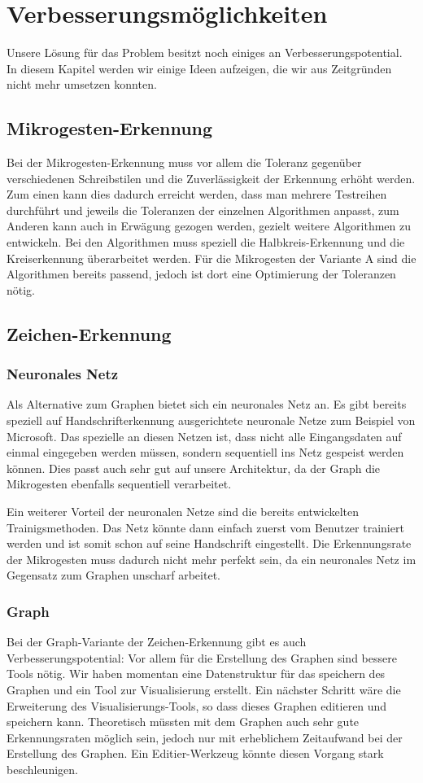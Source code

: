 \chapter{Verbesserungsmöglichkeiten}
Unsere Lösung für das Problem besitzt noch einiges an Verbesserungspotential. In diesem Kapitel werden wir einige Ideen aufzeigen, die wir aus Zeitgründen nicht mehr umsetzen konnten.

\section{Mikrogesten-Erkennung}
Bei der Mikrogesten-Erkennung muss vor allem die Toleranz gegenüber verschiedenen Schreibstilen und die Zuverlässigkeit der Erkennung erhöht werden. Zum einen kann dies dadurch erreicht werden, dass man mehrere Testreihen durchführt und jeweils die Toleranzen der einzelnen Algorithmen anpasst, zum Anderen kann auch in Erwägung gezogen werden, gezielt weitere Algorithmen zu entwickeln. 
Bei den Algorithmen muss speziell die Halbkreis-Erkennung und die Kreiserkennung überarbeitet werden. Für die Mikrogesten der Variante A sind die Algorithmen bereits passend, jedoch ist dort eine Optimierung der Toleranzen nötig.

\section{Zeichen-Erkennung}
\subsection{Neuronales Netz}
Als Alternative zum Graphen bietet sich ein neuronales Netz an. Es gibt bereits speziell auf Handschrifterkennung ausgerichtete neuronale Netze zum Beispiel von Microsoft. Das spezielle an diesen Netzen ist, dass nicht alle Eingangsdaten auf einmal eingegeben werden müssen, sondern sequentiell ins Netz gespeist werden können. Dies passt auch sehr gut auf unsere Architektur, da der Graph die Mikrogesten ebenfalls sequentiell verarbeitet.

Ein weiterer Vorteil der neuronalen Netze sind die bereits entwickelten Trainigsmethoden. Das Netz könnte dann einfach zuerst vom Benutzer trainiert werden und ist somit schon auf seine Handschrift eingestellt. Die Erkennungsrate der Mikrogesten muss dadurch nicht mehr perfekt sein, da ein neuronales Netz im Gegensatz zum Graphen unscharf arbeitet. 

\subsection{Graph}
Bei der Graph-Variante der Zeichen-Erkennung gibt es auch Verbesserungspotential: Vor allem für die Erstellung des Graphen sind bessere Tools nötig. Wir haben momentan eine Datenstruktur für das speichern des Graphen und ein Tool zur Visualisierung erstellt. Ein nächster Schritt wäre die Erweiterung des Visualisierungs-Tools, so dass dieses Graphen editieren und speichern kann. Theoretisch müssten mit dem Graphen auch sehr gute Erkennungsraten möglich sein, jedoch nur mit erheblichem Zeitaufwand bei der Erstellung des Graphen. Ein Editier-Werkzeug könnte diesen Vorgang stark beschleunigen.

